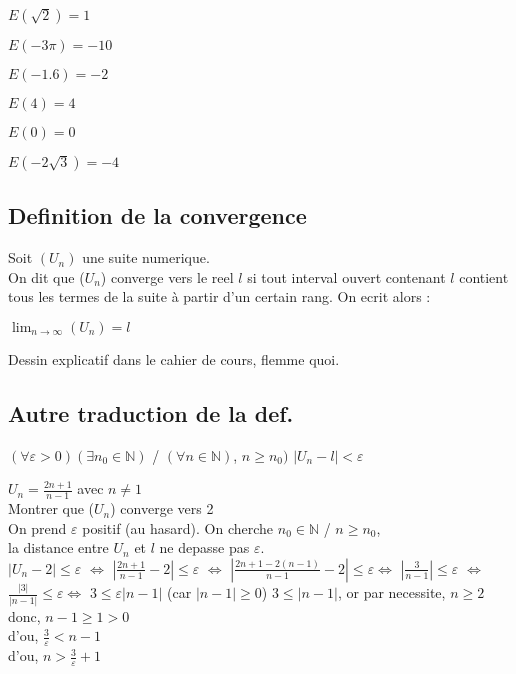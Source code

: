 \documentclass[a4paper,10pt]{book}
\begin{document}
		\exemple
			\begin{description}
				\item $E(\sqrt{2}) = 1$
				\item $E(-3\pi) = -10$
				\item $E(-1.6) = -2$
				\item $E(4) = 4$
				\item $E(0) = 0$
				\item $E(-2\sqrt{3}) = -4$
			\end{description}

			\subsection{Definition de la convergence}
			\label{subs:Definition de la convergence}

			\begin{Def}
				Soit $(U_n)$ une suite numerique.\\
				On dit que ($U_n$) converge vers le reel $l$ si tout interval ouvert contenant $l$ contient tous les termes de la suite à partir d'un certain rang. On ecrit alors :
				\begin{center}
					$ \lim_{n \rightarrow \infty} (U_n) = l$
				\end{center}
			\end{Def}

			\begin{rem}
				Dessin explicatif dans le cahier de cours, flemme quoi.
			\end{rem}

			\subsection{Autre traduction de la def.}
			\label{subs:Autre traduction de la def.}
			\begin{center}
					$(\forall \varepsilon > 0)(\exists n_0 \in \mathbb{N})$ / $(\forall n \in \mathbb{N})$, $n \geq n_0)$  $\left| U_n - l \right| < \varepsilon$
			\end{center}

			\exemple
				$U_n = \frac{2n+1}{n-1}$ avec $n \neq 1$\\
				Montrer que ($U_n$) converge vers 2\\
				On prend $\varepsilon$ positif (au hasard). On cherche $n_0 \in \mathbb{N}$ / $n \geq n_0$,\\
				la distance entre $U_n$ et $l$ ne depasse pas $\varepsilon$.\\
				$|U_n - 2| \leq \varepsilon$ $ \Leftrightarrow $ $|\frac{2n+1}{n-1} - 2| \leq \varepsilon$ $ \Leftrightarrow $ $|\frac{2n+1 -2(n-1)}{n-1} -2|\leq \varepsilon$$ \Leftrightarrow $ $|\frac{3}{n-1}|\leq \varepsilon$  $ \Leftrightarrow $ $\frac{|3|}{|n-1|}\leq \varepsilon$$ \Leftrightarrow $ $3 \leq \varepsilon|n-1|$ (car $|n-1| \geq 0$)
				$3 \leq |n-1|$, or par necessite, $n \geq 2$\\
				donc, $n-1 \geq 1 > 0$\\
				d'ou, $\frac{3}{\varepsilon} < n-1$\\
				d'ou, $n>\frac{3}{\varepsilon} + 1$\\
\end{document}
